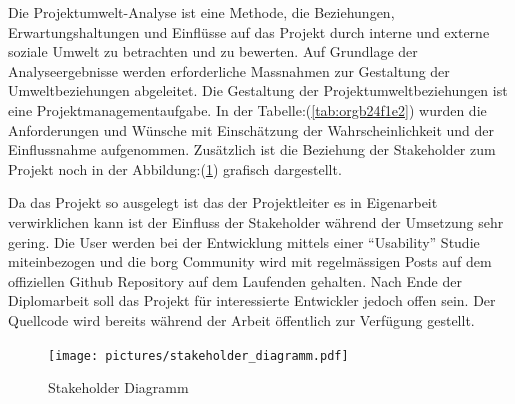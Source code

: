 Die Projektumwelt-Analyse ist eine Methode, die Beziehungen,
Erwartungshaltungen und Einflüsse auf das Projekt durch interne und
externe soziale Umwelt zu betrachten und zu bewerten. Auf Grundlage
der Analyseergebnisse werden erforderliche Massnahmen zur Gestaltung
der Umweltbeziehungen abgeleitet. Die Gestaltung der
Projektumweltbeziehungen ist eine Projektmanagementaufgabe. In der
Tabelle:(\ref{tab:orgb24f1e2}) wurden die Anforderungen und Wünsche
mit Einschätzung der Wahrscheinlichkeit und der Einflussnahme aufgenommen.
Zusätzlich ist die Beziehung der Stakeholder zum Projekt noch in der
Abbildung:(\ref{fig:org5970836}) grafisch dargestellt.

Da das Projekt so ausgelegt ist das der Projektleiter es in Eigenarbeit
verwirklichen kann ist der Einfluss der Stakeholder während der Umsetzung sehr
gering. Die User werden bei der Entwicklung mittels einer "`Usability"' Studie
miteinbezogen und die \gls{borg} Community wird mit regelmässigen Posts auf dem
offiziellen Github Repository auf dem Laufenden gehalten.
Nach Ende der Diplomarbeit soll das Projekt für interessierte Entwickler jedoch
offen sein. Der Quellcode wird bereits während der Arbeit öffentlich zur
Verfügung gestellt.

\begin{figure}[htbp]
\centering
\texttt{[image: pictures/stakeholder\_diagramm.pdf]}
\caption{\label{fig:org5970836}
Stakeholder Diagramm}
\end{figure}

